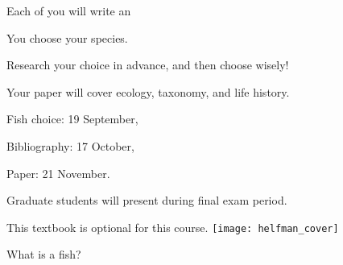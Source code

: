 \documentclass[t,handout]{beamer}  %
\begin{document}
\begin{frame}[t,plain]{Each of you will write an }

	\hangpara You choose your species.
	
	\hspace{2em} Research your choice in advance, and then choose wisely! 

	\hangpara Your paper will cover ecology, taxonomy, and life history.

	\hangpara {}
	
	\hspace{2em} Fish choice: 19 September,
	
	\hspace{2em} Bibliography: 17 October,
	
	\hspace{2em} Paper: 21 November.
	
	\hangpara Graduate students will present during final exam period.

\end{frame}

%
%	
%
%
%
%	
%	
%	
%
\begin{frame}[t,plain]{This textbook is optional for this course.}
	\centering
		\texttt{[image: helfman\_cover]} 
\end{frame}


{
\begin{frame}[t,plain]{What is a fish?}
\end{frame}
}
\end{document}
